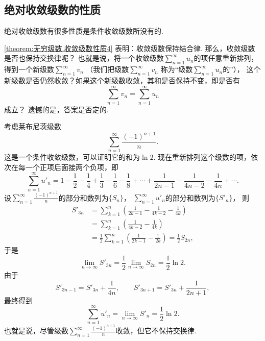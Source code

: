 \subsection{绝对收敛级数的性质}
绝对收敛级数有很多性质是条件收敛级数所没有的.

\cref{theorem:无穷级数.收敛级数性质4} 表明：收敛级数保持结合律.
那么，收敛级数是否也保持交换律呢？
也就是说，将一个收敛级数\(\sum_{n=1}^\infty u_n\)的项任意重新排列，
得到一个新级数\(\sum_{n=1}^\infty v_n\)
（我们把级数\(\sum_{n=1}^\infty v_n\)
称为“级数\(\sum_{n=1}^\infty u_n\)的”），
这个新级数是否仍然收敛？如果这个新级数收敛，其和是否保持不变，即是否有\[
	\sum_{n=1}^\infty v_n = \sum_{n=1}^\infty u_n
\]成立？
遗憾的是，答案是否定的.

考虑莱布尼茨级数\[
	\sum_{n=1}^\infty \frac{(-1)^{n+1}}n.
\]
这是一个条件收敛级数，可以证明它的和为\(\ln2\).
现在重新排列这个级数的项，依次在每一个正项后面接两个负项，即\[
	\sum_{n=1}^\infty u'_n
	= 1 - \frac12 - \frac14
	+ \frac13 - \frac16 - \frac18
	+ \dotsb
	+ \frac1{2n-1} - \frac1{4n-2} - \frac1{4n}
	+ \dotsb.
\]
设\(\sum_{n=1}^\infty \frac{(-1)^{n+1}}n\)的部分和数列为\(\{S_n\}\)，
\(\sum_{n=1}^\infty u'_n\)的部分和数列为\(\{S'_n\}\)，
则\begin{align*}
	S'_{3n}
	&= \sum_{k=1}^n \left(
		\frac1{2k-1} - \frac1{4k-2} - \frac1{4k}
	\right) \\
	&= \sum_{k=1}^n \left(
		\frac1{4k-2} - \frac1{4k}
	\right) \\
	&= \frac12 \sum_{k=1}^n \left(
		\frac1{2k-1} - \frac1{2k}
	\right)
	= \frac12 S_{2n},
\end{align*}
于是\[
	\lim_{n\to\infty} S'_{3n}
	= \frac12 \lim_{n\to\infty} S_{2n}
	= \frac12 \ln 2.
\]
由于\[
	S'_{3n-1} = S'_{3n} + \frac1{4n},
	\qquad
	S'_{3n+1} = S'_{3n} + \frac1{2n+1},
\]
最终得到\[
	\sum_{n=1}^\infty u'_n
	= \lim_{n\to\infty} S'_n
	= \frac12 \ln 2.
\]
也就是说，尽管级数\(\sum_{n=1}^\infty \frac{(-1)^{n+1}}n\)收敛，但它不保持交换律.

